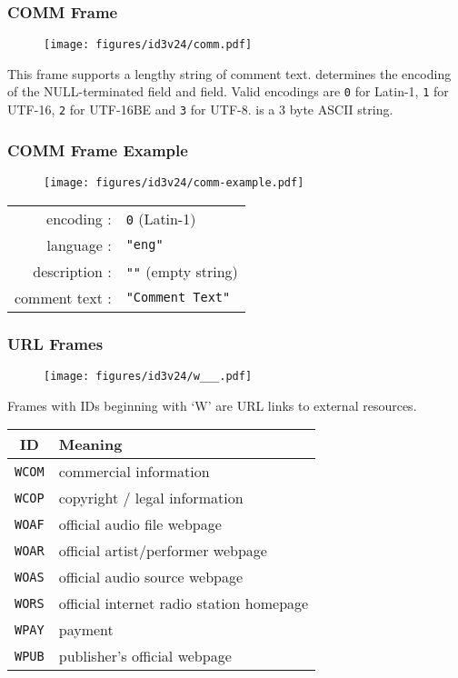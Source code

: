 \clearpage

\subsubsection{COMM Frame}
\begin{figure}[h]
\texttt{[image: figures/id3v24/comm.pdf]}
\end{figure}
\par
\noindent
This frame supports a lengthy string of comment text.
 determines the encoding of the NULL-terminated
 field and  field.
Valid encodings are \texttt{0} for Latin-1,
\texttt{1} for UTF-16,
\texttt{2} for UTF-16BE
and \texttt{3} for UTF-8.
 is a 3 byte ASCII string.

\subsubsection{COMM Frame Example}
\begin{figure}[h]
\texttt{[image: figures/id3v24/comm-example.pdf]}
\end{figure}
\begin{table}[h]
\begin{tabular}{rl}
encoding : & \texttt{0} (Latin-1) \\
language : & \texttt{"eng"} \\
description : & \texttt{""} (empty string) \\
comment text : & \texttt{"Comment Text"} \\
\end{tabular}
\end{table}

\clearpage

\subsubsection{URL Frames}
\begin{figure}[h]
\texttt{[image: figures/id3v24/w\_\_\_.pdf]}
\end{figure}
\par
\noindent
Frames with IDs beginning with `W' are URL links to external resources.
\par
\begin{table}[h]
\begin{tabular}{|c|l|}
\hline
ID & Meaning \\
\hline
\texttt{WCOM} & commercial information \\
\texttt{WCOP} & copyright / legal information \\
\texttt{WOAF} & official audio file webpage \\
\texttt{WOAR} & official artist/performer webpage \\
\texttt{WOAS} & official audio source webpage \\
\texttt{WORS} & official internet radio station homepage \\
\texttt{WPAY} & payment \\
\texttt{WPUB} & publisher's official webpage \\
\hline
\end{tabular}
\end{table}

